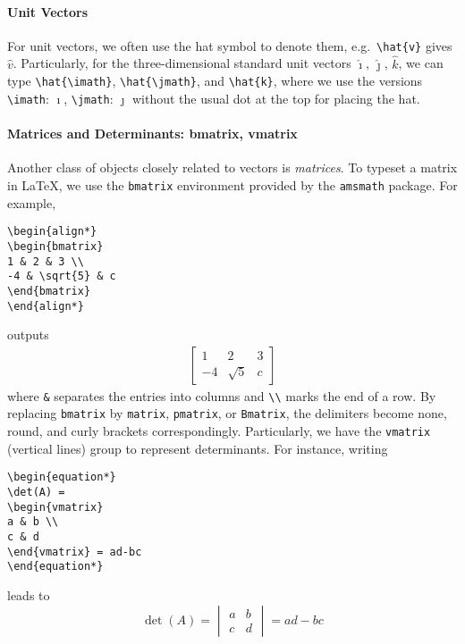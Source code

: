 \paragraph{Unit Vectors}
For unit vectors, we often use the hat symbol to denote them, e.g.\ \texttt{\textbackslash hat\{v\}} gives $\hat{v}$. Particularly, for the three-dimensional standard unit vectors $\hat{\imath}$, $\hat{\jmath}$, $\hat{k}$, we can type \texttt{\textbackslash hat\{\textbackslash imath\}}, \texttt{\textbackslash hat\{\textbackslash jmath\}}, and \texttt{\textbackslash hat\{k\}}, where we use the versions \texttt{\textbackslash imath}: $\imath$, \texttt{\textbackslash jmath}: $\jmath$ without the usual dot at the top for placing the hat. 

\paragraph{Matrices and Determinants: bmatrix, vmatrix}
Another class of objects closely related to vectors is \textit{matrices}. To typeset a matrix in \LaTeX{}, we use the \texttt{bmatrix} environment provided by the \verb|amsmath| package. For example,
\begin{lstlisting}
\begin{align*}
\begin{bmatrix}
1 & 2 & 3 \\
-4 & \sqrt{5} & c
\end{bmatrix}
\end{align*}    
\end{lstlisting}
outputs
\begin{align*}
\begin{bmatrix}
1 & 2 & 3 \\
-4 & \sqrt{5} & c
\end{bmatrix}
\end{align*}
where \texttt{\&} separates the entries into columns and \texttt{\textbackslash\textbackslash} marks the end of a row. By replacing \texttt{bmatrix} by \texttt{matrix}, \texttt{pmatrix}, or \texttt{Bmatrix}, the delimiters become none, round, and curly brackets correspondingly. Particularly, we have the \texttt{vmatrix} (vertical lines) group to represent determinants. For instance, writing
\begin{lstlisting}
\begin{equation*}
\det(A) =
\begin{vmatrix}
a & b \\
c & d
\end{vmatrix} = ad-bc
\end{equation*}
\end{lstlisting}
leads to
\begin{equation*}
\det(A) = 
\begin{vmatrix}
a & b \\
c & d
\end{vmatrix} = ad-bc
\end{equation*}

